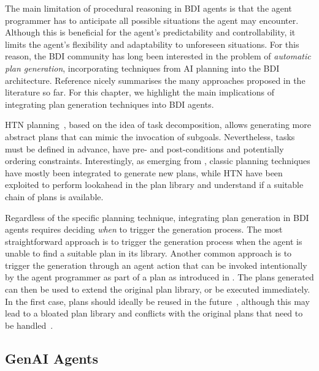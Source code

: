 The main limitation of procedural reasoning in \ac{BDI} agents
is that %
the agent programmer
has to anticipate all possible situations the agent may encounter.
%
Although this is beneficial for the agent's predictability and controllability,
it limits the agent's flexibility and adaptability to unforeseen situations.
%
For this reason,
the \ac{BDI} community has long been interested in the problem of \emph{automatic plan generation},
incorporating techniques from \ac{AI} planning into the \ac{BDI} architecture.
%
Reference \cite{MeneguzziS15} nicely summarises the many approaches proposed in the literature so far.
%
For this chapter, we highlight the main implications of integrating plan generation techniques into \ac{BDI} agents.

\ac{HTN} planning~\cite{georgievski2015ai},
based on the idea of task decomposition,
allows generating more abstract plans that can mimic the invocation of subgoals.
%
Nevertheless,
tasks must be defined in advance,
have pre- and post-conditions and potentially ordering constraints.
%
Interestingly,
as emerging from \cite{MeneguzziS15},
classic planning techniques have mostly been integrated to generate new plans,
while \ac{HTN} have been exploited to perform lookahead in the plan library and understand if a suitable chain of plans is available.

Regardless of the specific planning technique,
integrating plan generation in \ac{BDI} agents requires deciding \emph{when} to trigger the generation process.
%
The most straightforward approach is to trigger the generation process when the agent is unable to find a suitable plan in its library.
%
Another common approach is to trigger the generation through an agent action
that can be invoked intentionally by the agent programmer as part of a plan
as introduced in \cite{meneguzzi2008dalt}.
%
The plans generated can then be used to extend the original plan library,
or be executed immediately.
%
In the first case,
plans should ideally be reused in the future~\cite{SilvaSP09},
although this may lead to a bloated plan library
and conflicts with the original plans that need to be handled~\cite{cardoso2019emas}.

\subsection{\ac{GenAI} Agents}

